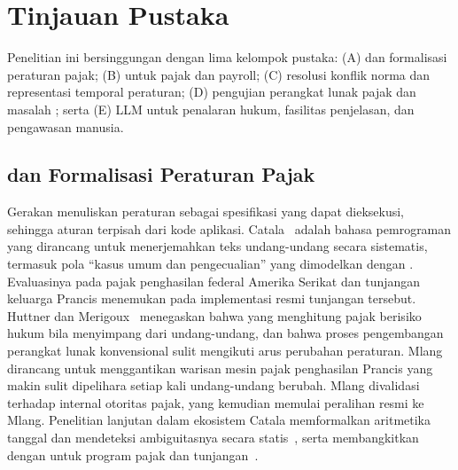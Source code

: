 \section{Tinjauan Pustaka}
\label{sec:tinjauan}

Penelitian ini bersinggungan dengan lima kelompok pustaka: (A)  dan formalisasi peraturan pajak; (B)  untuk pajak dan payroll; (C) resolusi konflik norma dan representasi temporal peraturan; (D) pengujian perangkat lunak pajak dan masalah ; serta (E) LLM untuk penalaran hukum, fasilitas penjelasan, dan pengawasan manusia.

\subsection{ dan Formalisasi Peraturan Pajak}

Gerakan  menuliskan peraturan sebagai spesifikasi yang dapat dieksekusi, sehingga aturan terpisah dari kode aplikasi. Catala~\cite{merigoux2021catala} adalah bahasa pemrograman yang dirancang untuk menerjemahkan teks undang-undang secara sistematis, termasuk pola ``kasus umum dan pengecualian'' yang dimodelkan dengan . Evaluasinya pada pajak penghasilan federal Amerika Serikat dan tunjangan keluarga Prancis menemukan  pada implementasi resmi tunjangan tersebut. Huttner dan Merigoux~\cite{huttner2022catala} menegaskan bahwa  yang menghitung pajak berisiko hukum bila menyimpang dari undang-undang, dan bahwa proses pengembangan perangkat lunak konvensional sulit mengikuti arus perubahan peraturan. Mlang~\cite{merigoux2021mlang} dirancang untuk menggantikan  warisan mesin pajak penghasilan Prancis yang makin sulit dipelihara setiap kali undang-undang berubah. Mlang divalidasi terhadap  internal otoritas pajak, yang kemudian memulai peralihan resmi ke Mlang. Penelitian lanjutan dalam ekosistem Catala memformalkan aritmetika tanggal dan mendeteksi ambiguitasnya secara statis~\cite{monat2024date}, serta membangkitkan  dengan  untuk program pajak dan tunjangan~\cite{goutagny2025cutecat}.

